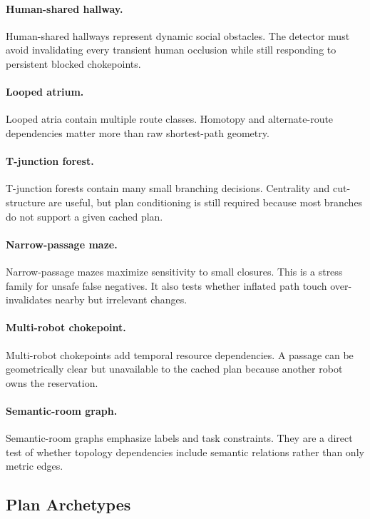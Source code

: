 \documentclass{article}
\begin{document}
\paragraph{Human-shared hallway.}
Human-shared hallways represent dynamic social obstacles. The detector must avoid invalidating every transient human occlusion while still responding to persistent blocked chokepoints.

\paragraph{Looped atrium.}
Looped atria contain multiple route classes. Homotopy and alternate-route dependencies matter more than raw shortest-path geometry.

\paragraph{T-junction forest.}
T-junction forests contain many small branching decisions. Centrality and cut-structure are useful, but plan conditioning is still required because most branches do not support a given cached plan.

\paragraph{Narrow-passage maze.}
Narrow-passage mazes maximize sensitivity to small closures. This is a stress family for unsafe false negatives. It also tests whether inflated path touch over-invalidates nearby but irrelevant changes.

\paragraph{Multi-robot chokepoint.}
Multi-robot chokepoints add temporal resource dependencies. A passage can be geometrically clear but unavailable to the cached plan because another robot owns the reservation.

\paragraph{Semantic-room graph.}
Semantic-room graphs emphasize labels and task constraints. They are a direct test of whether topology dependencies include semantic relations rather than only metric edges.

\subsection{Plan Archetypes}
\end{document}
